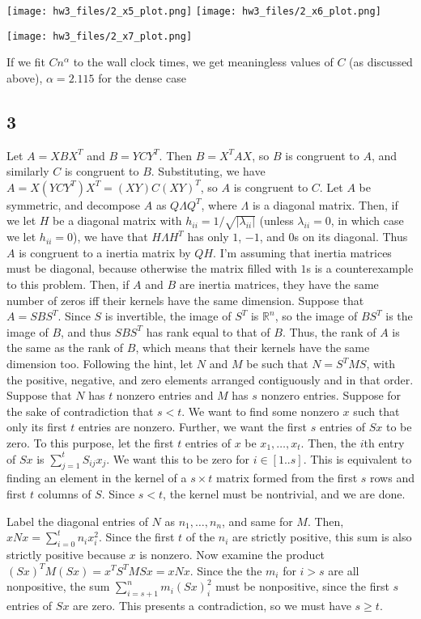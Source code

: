 \documentclass{article}
\newcommand{\rn}{\mathbb{R}}
\begin{document}
\texttt{[image: hw3\_files/2\_x5\_plot.png]}
\texttt{[image: hw3\_files/2\_x6\_plot.png]}

\texttt{[image: hw3\_files/2\_x7\_plot.png]}

If we fit $Cn^\alpha$ to the wall clock times, we get meaningless values of $C$ (as discussed above), $\alpha=2.115$ for the dense case
\subsection*{3}
Let $A=XBX^{T}$ and $B=YCY^{T}$. Then $B=X^{T}AX$, so $B$ is congruent to $A$, and similarly $C$ is congruent to $B$. Substituting, we have $A=X(YCY^{T})X^{T}=(XY)C(XY)^{T}$, so $A$ is congruent to $C$.
Let $A$ be symmetric, and decompose $A$ as $Q\Lambda Q^{T}$, where $\Lambda$ is a diagonal matrix. Then, if we let $H$ be a diagonal matrix with $h_{ii}=1/\sqrt{|\lambda_{ii}|}$ (unless $\lambda_{ii}=0$, in which case we let $h_{ii}=0$), we have that $H\Lambda H^T$ has only $1$, $-1$, and $0$s on its diagonal. Thus $A$ is congruent to a inertia matrix by $QH$.
I'm assuming that inertia matrices must be diagonal, because otherwise the matrix filled with $1$s is a counterexample to this problem. Then, if $A$ and $B$ are inertia matrices, they have the same number of zeros iff their kernels have the same dimension. Suppose that $A=SBS^T$. Since $S$ is invertible, the image of $S^T$ is $\rn^n$, so the image of $BS^T$ is the image of $B$, and thus $SBS^T$ has rank equal to that of $B$. Thus, the rank of $A$ is the same as the rank of $B$, which means that their kernels have the same dimension too.
Following the hint, let $N$ and $M$ be such that $N=S^TMS$, with the positive, negative, and zero elements arranged contiguously and in that order. Suppose that $N$ has $t$ nonzero entries and $M$ has $s$ nonzero entries. Suppose for the sake of contradiction that $s<t$. We want to find some nonzero $x$ such that only its first $t$ entries are nonzero. Further, we want the first $s$ entries of $Sx$ to be zero. To this purpose, let the first $t$ entries of $x$ be $x_1,\ldots,x_t$. Then, the $i$th entry of $Sx$ is $\sum_{j=1}^t S_{ij}x_j$. We want this to be zero for $i\in[1..s]$. This is equivalent to finding an element in the kernel of a $s\times t$ matrix formed from the first $s$ rows and first $t$ columns of $S$. Since $s<t$, the kernel must be nontrivial, and we are done.

Label the diagonal entries of $N$ as $n_1,\ldots,n_n$, and same for $M$. Then, $xNx=\sum_{i=0}^t n_ix_i^2$. Since the first $t$ of the $n_i$ are strictly positive, this sum is also strictly positive because $x$ is nonzero. Now examine the product $(Sx)^TM(Sx)=x^TS^TMSx=xNx$. Since the the $m_i$ for $i>s$ are all nonpositive, the sum $\sum_{i=s+1}^nm_i(Sx)_i^2$ must be nonpositive, since the first $s$ entries of $Sx$ are zero. This presents a contradiction, so we must have $s\geq t$.
\end{document}
